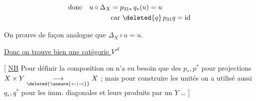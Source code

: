 \[
\begin{aligned}
\text{donc}\quad u\circ\Delta_X&=p_{31*}\,q_*(u)=u\\
&\text{car }\deleted{q}\,p_{31}q=\mathrm{id}
\end{aligned}
\]

On prouve de façon analogue que $\Delta_X\circ u=u$.

\uline{Donc on trouve bien une catégorie $V^{\mathcal A}$}

[ \uline{NB} Pour définir la composition on n'a eu besoin que des $p_*,p^*$ pour projections $X\times Y\underset{\deleted{\unsure{\leftarrow|\rightarrow}}}{\longrightarrow}X$ ; mais pour  construire les unités on a utilisé aussi $q_*,q^*$ pour les imm. diagonales et leurs produits par un $Y$ \ldots{} ]

